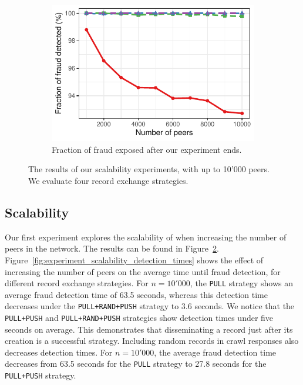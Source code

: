\begin{figure}[t]
\begin{subfigure}{.5\columnwidth}
		\includegraphics[width=\columnwidth]{trustchain/assets/scalability_num_detected}
		\caption{Fraction of fraud exposed after our experiment ends.}
		\label{fig:experiment_scalability_num_detected}
	\end{subfigure}
	\caption{The results of our scalability experiments, with up to 10'000 peers. We evaluate four record exchange strategies.}
	\label{fig:scalability_experiments}
\end{figure}

\subsection{Scalability}
\label{sec:fraud_detection_experiment}
Our first experiment explores the scalability of \ModelName{} when increasing the number of peers in the network.
The results can be found in Figure~\ref{fig:scalability_experiments}.
Figure~\ref{fig:experiment_scalability_detection_times} shows the effect of increasing the number of peers on the average time until fraud detection, for different record exchange strategies.
For $ n = 10'000 $, the \texttt{PULL} strategy shows an average fraud detection time of 63.5 seconds, whereas this detection time decreases under the \texttt{PULL+RAND+PUSH} strategy to 3.6 seconds.
We notice that the \texttt{PULL+PUSH} and \texttt{PULL+RAND+PUSH} strategies show detection times under five seconds on average.
This demonstrates that disseminating a record just after its creation is a successful strategy.
Including random records in crawl responses also decreases detection times.
For $ n = 10'000 $, the average fraud detection time decreases from 63.5 seconds for the \texttt{PULL} strategy to 27.8 seconds for the \texttt{PULL+PUSH} strategy.

